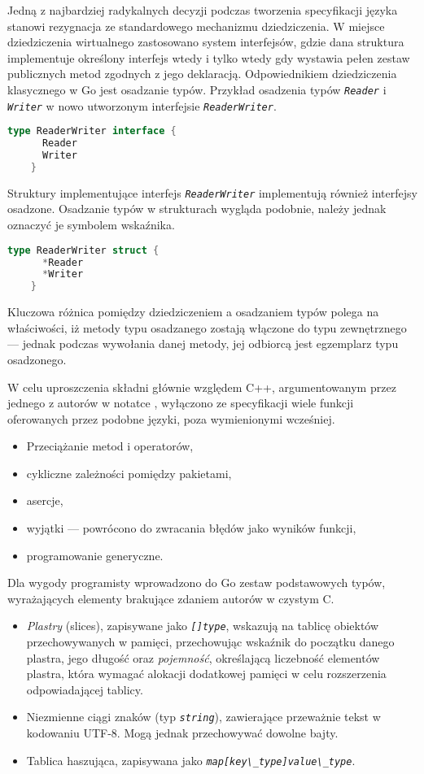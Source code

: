   \par{
  Jedną z najbardziej radykalnych decyzji podczas tworzenia specyfikacji języka stanowi rezygnacja ze standardowego mechanizmu dziedziczenia. W miejsce dziedziczenia wirtualnego zastosowano system interfejsów, gdzie dana struktura implementuje określony interfejs wtedy i tylko wtedy gdy wystawia pełen zestaw publicznych metod zgodnych z jego deklaracją. Odpowiednikiem dziedziczenia klasycznego w Go jest osadzanie typów.
  Przykład osadzenia typów \textit{\lstinline{Reader}} i \textit{\lstinline{Writer}} w nowo utworzonym interfejsie \textit{\lstinline{ReaderWriter}}.
  \begin{lstlisting}[language=go]
    type ReaderWriter interface {
      Reader
      Writer
    }
  \end{lstlisting}
  Struktury implementujące interfejs \textit{\lstinline{ReaderWriter}} implementują również interfejsy osadzone.
  Osadzanie typów w strukturach wygląda podobnie, należy jednak oznaczyć je symbolem wskaźnika.
  \begin{lstlisting}[language=go]
    type ReaderWriter struct {
      *Reader
      *Writer
    }
  \end{lstlisting}
  Kluczowa różnica pomiędzy dziedziczeniem a osadzaniem typów polega na właściwości, iż metody typu osadzanego zostają włączone do typu zewnętrznego --- jednak podczas wywołania danej metody, jej odbiorcą jest egzemplarz typu osadzonego. \cite{godoc:embedding}
}
\par {
W celu uproszczenia składni głównie względem C++, argumentowanym przez jednego z autorów w notatce \cite{Pike:LessIsMore}, wyłączono ze specyfikacji wiele funkcji oferowanych przez podobne języki, poza wymienionymi wcześniej.
  \begin{itemize}
    \item Przeciążanie metod i operatorów,
    \item cykliczne zależności pomiędzy pakietami,
    \item asercje,
    \item wyjątki --- powrócono do zwracania błędów jako wyników funkcji,
    \item programowanie generyczne.
  \end{itemize}
}
\par{
  Dla wygody programisty wprowadzono do Go zestaw podstawowych typów, wyrażających elementy brakujące zdaniem autorów w czystym C.
  \begin{itemize}
    \item \emph{Plastry} (slices), zapisywane jako \textit{\lstinline{[]type}}, wskazują na tablicę obiektów przechowywanych w pamięci, przechowując wskaźnik do początku danego plastra, jego długość oraz \emph{pojemność}, określającą liczebność elementów plastra, która wymagać alokacji dodatkowej pamięci w celu rozszerzenia odpowiadającej tablicy.
    \item Niezmienne ciągi znaków (typ \textit{\lstinline{string}}), zawierające przeważnie tekst w kodowaniu UTF-8. Mogą jednak przechowywać dowolne bajty.
    \item Tablica haszująca, zapisywana jako \textit{\lstinline{map[key\_type]value\_type}}.
  \end{itemize}
}
